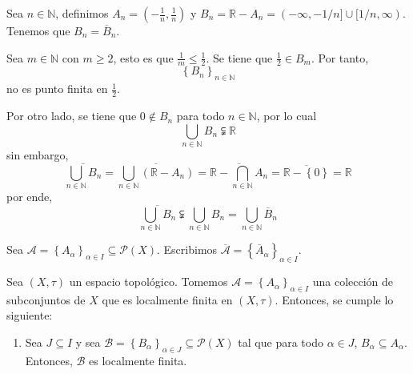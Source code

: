 \documentclass[12pt]{report}
\theoremstyle{largebreak}
\begin{document}
    \begin{exa}[\textbf{**}]
        Sea $n\in\mathbb{N}$, definimos $A_n=\left(-\frac{1}{n},\frac{1}{n}\right)$ y $B_n=\mathbb{R}-A_n=(-\infty,-1/n]\cup[1/n,\infty)$. Tenemos que $B_n=\overline{B}_n$.

        Sea $m\in\mathbb{N}$ con $m\geq 2$, esto es que $\frac{1}{m}\leq\frac{1}{2}$. Se tiene que $\frac{1}{2}\in B_m$. Por tanto,
        \begin{equation*}
            \left\{B_n\right\}_{n\in\mathbb{N}}
        \end{equation*}
        no es punto finita en $\frac{1}{2}$.

        Por otro lado, se tiene que $0\notin B_n$ para todo $n\in\mathbb{N}$, por lo cual
        \begin{equation*}
            \bigcup_{ n\in\mathbb{N}}B_n\subsetneqq \mathbb{R}
        \end{equation*}
        sin embargo,
        \begin{equation*}
            \overline{\bigcup_{ n\in\mathbb{N}}B_n}=\overline{\bigcup_{ n\in\mathbb{N}}(\mathbb{R}-A_n)}=\overline{\mathbb{R}-\bigcap_{ n\in\mathbb{N}}A_n}=\overline{\mathbb{R}-\left\{ 0\right\}}=\mathbb{R}
        \end{equation*}
        por ende,
        \begin{equation*}
            \overline{\bigcup_{ n\in\mathbb{N}}B_n}\subsetneqq \bigcup_{ n\in\mathbb{N}}B_n=\bigcup_{ n\in\mathbb{N}}\overline{B}_n
        \end{equation*}
    \end{exa}

    \begin{obs}
        Sea $\mathcal{A}=\left\{A_\alpha \right\}_{\alpha\in I}\subseteq\mathcal{P}(X)$. Escribimos $\overline{\mathcal{A}}=\left\{\overline{A}_\alpha \right\}_{\alpha\in I}$.
    \end{obs}

    \begin{propo}
        Sea $(X,\tau)$ un espacio topológico. Tomemos $\mathcal{A}=\left\{A_\alpha \right\}_{\alpha\in I}$ una colección de subconjuntos de $X$ que es localmente finita en $(X,\tau)$. Entonces, se cumple lo siguiente:
        \begin{enumerate}
            \item Sea $J\subseteq I$ y sea $\mathcal{B}=\left\{B_\alpha \right\}_{\alpha\in J}\subseteq\mathcal{P}(X)$ tal que para todo $\alpha\in J$, $B_\alpha\subseteq A_\alpha$. Entonces, $\mathcal{B}$ es localmente finita.
        \end{enumerate}
    \end{propo}
\end{document}
